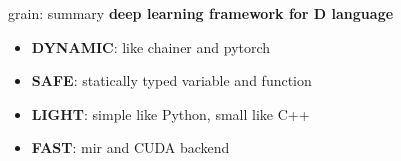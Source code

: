 \documentclass[aspectratio=169,
  14pt,xcolor=dvipsnames,table,professional font,dvipdfmx]{beamer}
\begin{document}
\begin{frame}{grain: summary} %
  \large
  \textbf{deep learning framework for \alert{D language}}
  \vspace{1em}
  \begin{itemize}
    \large
  \item \textbf{DYNAMIC}: like chainer and pytorch
  \item \textbf{SAFE}: statically typed variable and function
  \item \textbf{LIGHT}: simple like Python, small like C++
  \item \textbf{FAST}: mir and CUDA backend
  \end{itemize}
\end{frame}

{
\begin{frame}{} %

\end{frame}}
\end{document}
